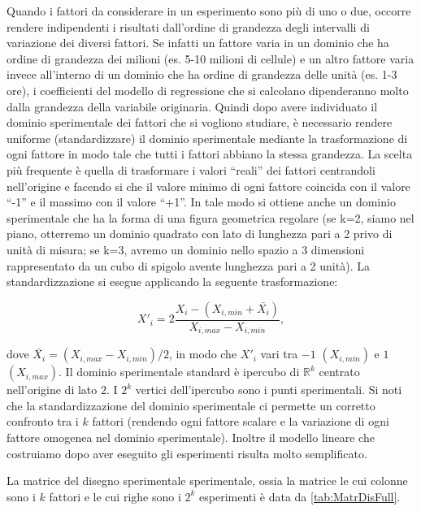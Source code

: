 \documentclass[
]{book}
\begin{document}
Quando i fattori da considerare in un esperimento sono più di uno o due, occorre rendere indipendenti i risultati dall'ordine di grandezza degli intervalli di variazione dei diversi fattori. Se infatti un fattore varia in un dominio che ha ordine di grandezza dei milioni (es. 5-10 milioni di cellule) e un altro fattore varia invece all'interno di un dominio che ha ordine di grandezza delle unità (es. 1-3 ore), i coefficienti del modello di regressione che si calcolano dipenderanno molto dalla grandezza della variabile originaria. Quindi dopo avere individuato il dominio sperimentale dei fattori che si vogliono studiare, è necessario rendere uniforme (standardizzare) il dominio sperimentale mediante la trasformazione di ogni fattore in modo tale che tutti i fattori abbiano la stessa grandezza. La scelta più frequente è quella di trasformare i valori ``reali'' dei fattori centrandoli nell'origine e facendo si che il valore minimo di ogni fattore coincida con il valore ``-1'' e il massimo con il valore ``+1''. In tale modo si ottiene anche un dominio sperimentale che ha la forma di una figura geometrica regolare (se k=2, siamo nel piano, otterremo un dominio quadrato con lato di lunghezza pari a 2 privo di unità di misura; se k=3, avremo un dominio nello spazio a 3 dimensioni rappresentato da un cubo di spigolo avente lunghezza pari a 2 unità). La standardizzazione si esegue applicando la seguente trasformazione:

\begin{equation*}
    X'_i=2\frac{X_i-(X_{i,min}+\bar{X_i})}{X_{i,max}-X_{i,min}},
\end{equation*}

dove \(\bar{X_i}=(X_{i,max}-X_{i,min})/2\), in modo che \(X'_i\) vari tra \(-1\) \((X_{i,min})\) e \(1\) \((X_{i,max})\). Il dominio sperimentale standard è ipercubo di \(\mathbb{R}^k\) centrato nell'origine di lato \(2\). I \(2^k\) vertici dell'ipercubo sono i punti sperimentali.\newline
Si noti che la standardizzazione del dominio sperimentale ci permette un corretto confronto tra i \(k\) fattori (rendendo ogni fattore scalare e la variazione di ogni fattore omogenea nel dominio sperimentale). Inoltre il modello lineare che costruiamo dopo aver eseguito gli esperimenti risulta molto semplificato.

La matrice del disegno sperimentale sperimentale, ossia la matrice le cui colonne sono i \(k\) fattori e le cui righe sono i \(2^k\) esperimenti è data da \autoref{tab:MatrDisFull}.
\end{document}
